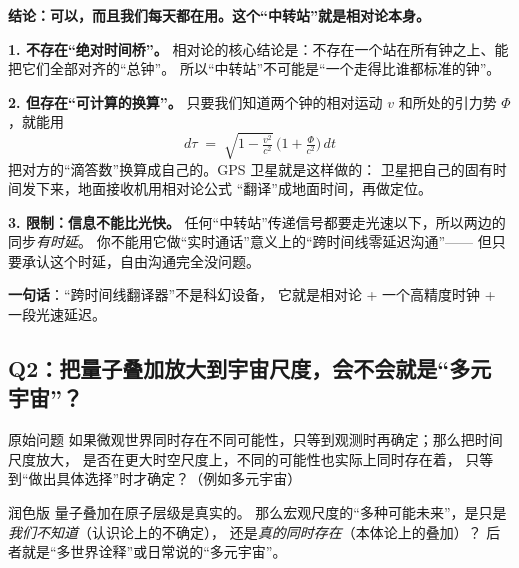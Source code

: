 \documentclass[11pt,a4paper]{ctexart}
\begin{document}
\begin{answerblock}
\textbf{结论：可以，而且我们每天都在用。这个``中转站''就是相对论本身。}

\smallskip
\textbf{1. 不存在``绝对时间桥''。}
相对论的核心结论是：不存在一个站在所有钟之上、能把它们全部对齐的``总钟''。
所以``中转站''不可能是``一个走得比谁都标准的钟''。

\smallskip
\textbf{2. 但存在``可计算的换算''。}
只要我们知道两个钟的相对运动 $v$ 和所处的引力势 $\Phi$，就能用
\[
  d\tau \;=\; \sqrt{1-\tfrac{v^2}{c^2}}\,\Big(1+\tfrac{\Phi}{c^2}\Big)\,dt
\]
把对方的``滴答数''换算成自己的。GPS 卫星就是这样做的：
卫星把自己的固有时间发下来，地面接收机用相对论公式
``翻译''成地面时间，再做定位。

\smallskip
\textbf{3. 限制：信息不能比光快。}
任何``中转站''传递信号都要走光速以下，所以两边的同步\emph{有时延}。
你不能用它做``实时通话''意义上的``跨时间线零延迟沟通''——
但只要承认这个时延，自由沟通完全没问题。

\smallskip
\textbf{一句话}：``跨时间线翻译器''不是科幻设备，
它就是相对论 + 一个高精度时钟 + 一段光速延迟。
\end{answerblock}

\subsection{Q2：把量子叠加放大到宇宙尺度，会不会就是``多元宇宙''？}

\begin{questionblock}{原始问题}
如果微观世界同时存在不同可能性，只等到观测时再确定；那么把时间尺度放大，
是否在更大时空尺度上，不同的可能性也实际上同时存在着，
只等到``做出具体选择''时才确定？（例如多元宇宙）
\end{questionblock}

\begin{questionblock}{润色版}
量子叠加在原子层级是真实的。
那么宏观尺度的``多种可能未来''，是只是\emph{我们不知道}（认识论上的不确定），
还是\emph{真的同时存在}（本体论上的叠加）？
后者就是``多世界诠释''或日常说的``多元宇宙''。
\end{questionblock}
\end{document}

